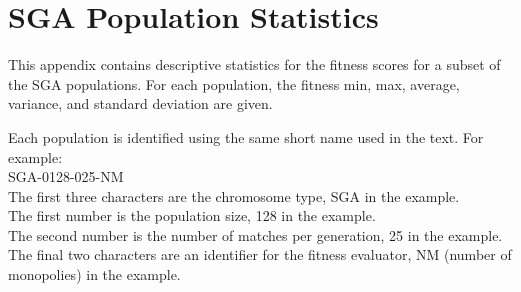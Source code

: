 \clearpage
\chapter{SGA Population Statistics}
\label{appendix:sgastats}

This appendix contains descriptive statistics for the fitness scores for a
subset of the SGA populations. For each population, the fitness min,
max, average, variance, and standard deviation are given.

Each population is identified using the same short name used in the text. For
example: \\ 

SGA-0128-025-NM \\ 

The first three characters are the chromosome type, SGA in the example. \\

The first number is the population size, 128 in the example. \\

The second number is the number of matches per generation, 25 in the example. \\

The final two characters are an identifier for the fitness evaluator, NM
(number of monopolies) in the example.

\newpage




